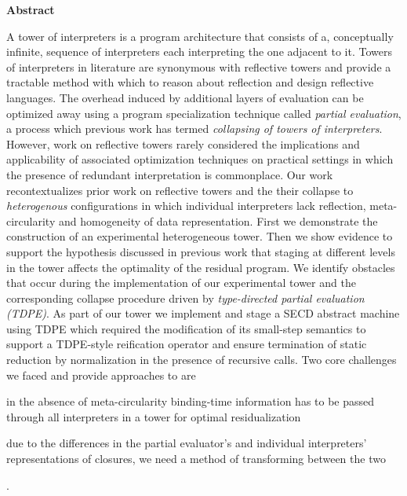 \newpage
{\Huge \bf Abstract}
\vspace{24pt} 

A tower of interpreters is a program architecture that consists of a, conceptually infinite, sequence of interpreters each interpreting the one adjacent to it. Towers of interpreters in literature are synonymous with reflective towers and provide a tractable method with which to reason about reflection and design reflective languages. The overhead induced by additional layers of evaluation can be optimized away using a program specialization technique called \textit{partial evaluation}, a process which previous work has termed \textit{collapsing of towers of interpreters}. However, work on reflective towers rarely considered the implications and applicability of associated optimization techniques on practical settings in which the presence of redundant interpretation is commonplace. Our work recontextualizes prior work on reflective towers and the their collapse to \textit{heterogenous} configurations in which individual interpreters lack reflection, meta-circularity and homogeneity of data representation. First we demonstrate the construction of an experimental heterogeneous tower. Then we show evidence to support the hypothesis discussed in previous work that staging at different levels in the tower affects the optimality of the residual program. We identify obstacles that occur during the implementation of our experimental tower and the corresponding collapse procedure driven by \textit{type-directed partial evaluation (TDPE)}. As part of our tower we implement and stage a SECD abstract machine using TDPE which required the modification of its small-step semantics to support a TDPE-style reification operator and ensure termination of static reduction by normalization in the presence of recursive calls. Two core challenges we faced and provide approaches to are
\begin{enumerate*}[label=(\arabic*)]
    \item in the absence of meta-circularity binding-time information has to be passed through all interpreters in a tower for optimal residualization
    \item due to the differences in the partial evaluator's and individual interpreters' representations of closures, we need a method of transforming between the two
\end{enumerate*}.

\newpage
\vspace*{\fill}
